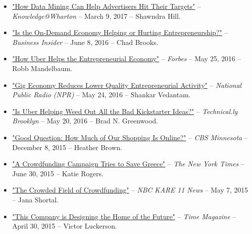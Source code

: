 \documentclass[10.5pt,letterpaper,sans]{moderncv}        %
\begin{document}
\begin{itemize}
\item \textcolor{gray}{\href{http://knowledge.wharton.upenn.edu/article/how-data-mining-can-help-advertisers/}{"How Data Mining Can Help Advertisers Hit Their Targets"}} -- \textit{Knowledge@Wharton} -- March 9, 2017 -- Shawndra Hill.

\item \textcolor{gray}{\href{http://www.businessnewsdaily.com/9132-on-demand-economy-effect.html}{"Is the On-Demand Economy Helping or Hurting Entrepreneurship?"}} -- \textit{Business Insider} -- June 8, 2016 -- Chad Brooks.

\item \textcolor{gray}{\href{http://www.forbes.com/sites/robbmandelbaum/2016/05/25/how-uber-helps-the-entrepreneurial-economy}{"How Uber Helps the Entrepreneurial Economy"}} -- \textit{Forbes} -- May 25, 2016 -- Robb Mandelbaum.

\item \textcolor{gray}{\href{http://www.npr.org/2016/05/24/479274199/gig-economy-reduces-lower-quality-entrepreneurial-activity-study-shows}{"Gig Economy Reduces Lower Quality Entrepreneurial Activity"}} -- \textit{National Public Radio (NPR)} -- May 24, 2016 -- Shankar Vedantam.

\item \textcolor{gray}{\href{http://technical.ly/brooklyn/2016/05/20/uber-kickstarter-brad-greenwood/}{"Is Uber Helping Weed Out All the Bad Kickstarter Ideas?"}} -- \textit{Technical.ly Brooklyn} -- May 20, 2016 -- Brad N. Greenwood.

\item \textcolor{gray}{\href{http://minnesota.cbslocal.com/2015/12/08/good-question-how-much-of-our-shopping-is-online/}{"Good Question: How Much of Our Shopping Is Online?"}} -- \textit{CBS Minnesota} -- December 8, 2015 -- Heather Brown.

\item \textcolor{gray}{\href{http://www.nytimes.com/2015/07/01/world/europe/a-crowdfunding-campaign-tries-to-save-greece.html}{"A Crowdfunding Campaign Tries to Save Greece"}} -- \textit{The New York Times} -- June 30, 2015 -- Katie Rogers. 

\item \textcolor{gray}{\href{http://www.kare11.com/story/news/local/2015/05/06/the-crowded-field-of-crowdfunding/70921732/}{"The Crowded Field of Crowdfunding"}} -- \textit{NBC KARE 11 News} -- May 7, 2015 -- Jana Shortal.

\item \textcolor{gray}{\href{http://time.com/3841448/this-company-is-designing-the-home-of-the-future/}{"This Company is Designing the Home of the Future"}} -- \textit{Time Magazine} -- April 30, 2015 -- Victor Luckerson.


\end{itemize}
\end{document}
